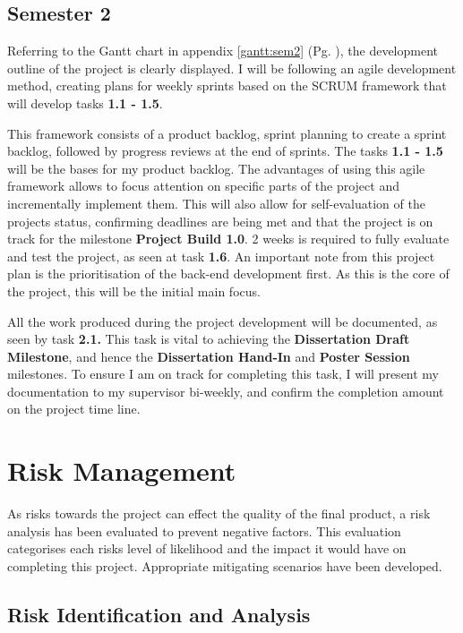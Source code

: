 \subsection{Semester 2}
\label{sec:management:pp:sem2}

\noindent Referring to the Gantt chart in appendix \ref{gantt:sem2} (Pg. \pageref{gantt:sem2}), the development outline of the project is clearly displayed. I will be following an agile development method, creating plans for weekly sprints based on the SCRUM framework that will develop tasks \textbf{1.1 - 1.5}. 

This framework consists of a product backlog, sprint planning to create a sprint backlog, followed by progress reviews at the end of sprints. The tasks \textbf{1.1 - 1.5} will be the bases for my product backlog. The advantages of using this agile framework allows to focus attention on specific parts of the project and incrementally implement them. This will also allow for self-evaluation of the projects status, confirming deadlines are being met and that the project is on track for the milestone \textbf{Project Build 1.0}. 2 weeks is required to fully evaluate and test the project, as seen at task \textbf{1.6}. An important note from this project plan is the prioritisation of the back-end development first. As this is the core of the project, this will be the initial main focus.

All the work produced during the project development will be documented, as seen by task \textbf{2.1.} This task is vital to achieving the \textbf{Dissertation Draft Milestone}, and hence the \textbf{Dissertation Hand-In} and \textbf{Poster Session} milestones. To ensure I am on track for completing this task, I will present my documentation to my supervisor bi-weekly, and confirm the completion amount on the project time line. 


\section{Risk Management}
\label{sec:management:ra}

\noindent As risks towards the project can effect the quality of the final product, a risk analysis has been evaluated to prevent negative factors. This evaluation categorises each risks level of likelihood and the impact it would have on completing this project. Appropriate mitigating scenarios have been developed.

\subsection{Risk Identification and Analysis}

